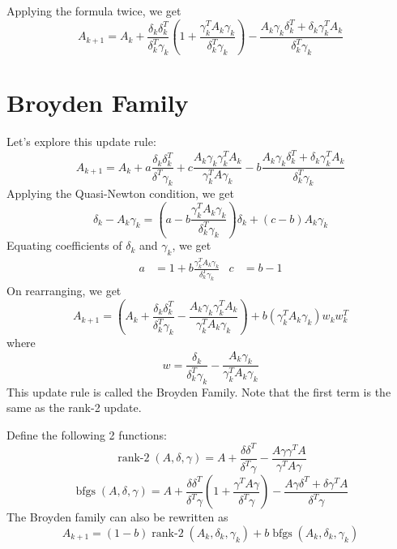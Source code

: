 Applying the formula twice, we get
\[ A_{k+1} = A_k + \frac{\delta_k\delta_k^T}{\delta_k^T\gamma_k}
\left( 1 + \frac{\gamma_k^TA_k\gamma_k}{\delta_k^T\gamma_k} \right)
- \frac{A_k\gamma_k\delta_k^T +  \delta_k\gamma_k^TA_k}{\delta_k^T\gamma_k} \]

\section{Broyden Family}

Let's explore this update rule:
\[ A_{k+1} = A_k + a\frac{\delta_k\delta_k^T}{\delta^T\gamma_k}
+ c\frac{A_k\gamma_k\gamma_k^TA_k}{\gamma_k^TA\gamma_k}
- b\frac{A_k\gamma_k\delta_k^T + \delta_k\gamma_k^TA_k}{\delta_k^T\gamma_k} \]
Applying the Quasi-Newton condition, we get
\[ \delta_k - A_k\gamma_k
= \left(a - b\frac{\gamma_k^TA_k\gamma_k}{\delta_k^T\gamma_k}\right)\delta_k + (c - b)A_k\gamma_k \]
Equating coefficients of $\delta_k$ and $\gamma_k$, we get
\begin{align*} a &= 1 + b\frac{\gamma_k^TA_k\gamma_k}{\delta_k^T\gamma_k} & c &= b-1 \end{align*}
On rearranging, we get
\[ A_{k+1} = \left( A_k + \frac{\delta_k\delta_k^T}{\delta_k^T\gamma_k}
- \frac{A_k\gamma_k\gamma_k^TA_k}{\gamma_k^TA_k\gamma_k} \right)
+ b(\gamma_k^TA_k\gamma_k)w_kw_k^T\]
where
\[ w = \frac{\delta_k}{\delta_k^T\gamma_k} - \frac{A_k\gamma_k}{\gamma_k^TA_k\gamma_k} \]
This update rule is called the Broyden Family.
Note that the first term is the same as the rank-2 update.

Define the following 2 functions:
\[ \operatorname{rank-2}(A, \delta, \gamma) = A + \frac{\delta\delta^T}{\delta^T\gamma}
- \frac{A\gamma\gamma^TA}{\gamma^TA\gamma} \]
\[ \operatorname{bfgs}(A, \delta, \gamma) = A + \frac{\delta\delta^T}{\delta^T\gamma}
\left( 1 + \frac{\gamma^TA\gamma}{\delta^T\gamma} \right)
- \frac{A\gamma\delta^T + \delta\gamma^TA}{\delta^T\gamma} \]
The Broyden family can also be rewritten as
\[ A_{k+1} = (1-b)\operatorname{rank-2}(A_k, \delta_k, \gamma_k) + b\operatorname{bfgs}(A_k, \delta_k, \gamma_k) \]


